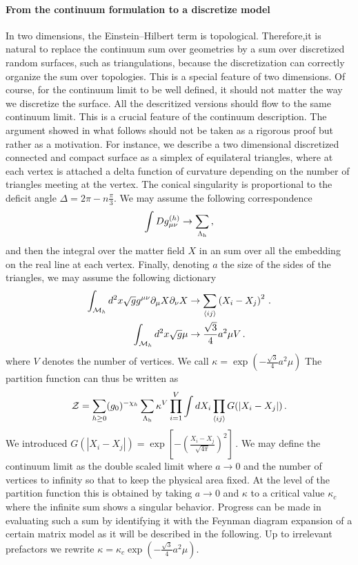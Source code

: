 \documentclass[a4paper]{article}
\begin{document}
\paragraph{From the continuum formulation to a discretize model}
In two dimensions, the Einstein–Hilbert term is topological. Therefore,it is natural to replace the continuum sum over geometries by a sum over discretized random surfaces, such as triangulations, because the discretization can correctly organize the sum over topologies. This is a special feature of two dimensions. Of course, for the continuum limit to be well defined, it should not matter the way we discretize the surface. All the descritized versions should flow to the same continuum limit. This is a crucial feature of the continuum description. The argument showed in what follows should not be taken as a rigorous proof but rather as a motivation.
For instance, we describe a two dimensional discretized connected and compact surface as a simplex of equilateral triangles, where at each vertex is attached a delta function of curvature depending on the number of triangles meeting at the vertex. The conical singularity is proportional to the deficit angle $\Delta = 2\pi - n\frac{\pi}{3}$. We may assume the following correspondence
\begin{equation}
   \int Dg^{(h)}_{\mu \nu } \rightarrow \sum_{\rm \Lambda_{h}}\,,
\end{equation}
and then the integral over the matter field $X$ in an sum over all the embedding on the real line at each vertex. Finally, denoting $a$ the size of the sides of the triangles, we may assume the following dictionary
\begin{equation}
\begin{aligned}
    \int_{\mathcal{M}_h} d^2 x \sqrt{g}g^{\mu \nu}\partial_\mu X \partial_\nu X &\rightarrow \sum_{\braket{ij}} \left(X_i-X_j\right)^2\,.\\
    \int_{\mathcal{M}_h} d^2 x \sqrt{g} \mu &\rightarrow \frac{\sqrt{3}}{4}a^2 \mu V\,.
\end{aligned}
\end{equation}
where $V$ denotes the number of vertices. We call $\kappa = \exp\left(-\frac{\sqrt{3}}{4}a^2 \mu\right)$ The partition function can thus be written as 
\begin{equation}
  \mathcal{Z} = \sum _{h\geq0} (g_0)^{-\chi_h} \sum_{\rm \Lambda_{h}} \kappa^V \prod_{i=1}^{V} \int dX_i \prod_{\braket{ij}}G(|X_i-X_j|)\,.
\end{equation}
We introduced $G(|X_i-X_j|)=\exp\left[-\left(\frac{X_i-X_j}{\sqrt{4\pi}}\right)^2\right]$\,. We may define the continuum limit as the double scaled limit where $a\to0$ and the number of vertices to infinity so that to keep the physical area fixed. At the level of the partition function this is obtained by taking $a\to0$ and $\kappa$ to a critical value $\kappa_c$ where the infinite sum shows a singular behavior. Progress can be made in evaluating such a sum by identifying it with the Feynman diagram expansion of a certain matrix model as it will be described in the following. Up to irrelevant prefactors we rewrite $\kappa = \kappa_c\exp\left(-\frac{\sqrt{3}}{4}a^2 \mu\right) $.
\end{document}
